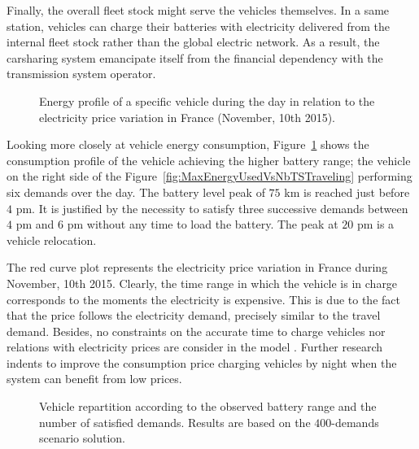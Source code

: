 \begin{bibunit}[ieeetr]
Finally, the overall fleet stock might serve the vehicles themselves.
In a same station, vehicles can charge their batteries with electricity delivered from the internal fleet stock rather than the global electric network.
As a result, the carsharing system emancipate itself from the financial dependency with the transmission system operator.


\begin{figure}[p]
\flushleft

\caption{Energy profile of a specific vehicle during the day in relation to the electricity price variation in France (November, 10th 2015).}
\label{fig:plotProfileV4}
\end{figure}

\bigskip
Looking more closely at vehicle energy consumption, Figure~\ref{fig:plotProfileV4} shows the consumption profile of the vehicle achieving the higher battery range; \ie the vehicle on the right side of the {Figure~\ref{fig:MaxEnergyUsedVsNbTSTraveling}} performing six demands over the day.
The battery level peak of $75$ km is reached just before $4$ pm.
It is justified by the necessity to satisfy three successive demands between $4$ pm and $6$ pm without any time to load the battery.
The peak at $20$ pm is a vehicle relocation.

The red curve plot represents the electricity price variation in France during November, 10th 2015.
Clearly, the time range in which the vehicle is in charge corresponds to the moments the electricity is expensive.
This is due to the fact that the price follows the electricity demand, precisely similar to the travel demand.
Besides, no constraints on the accurate time to charge vehicles nor relations with electricity prices are consider in the model {\ENERGY}.
Further research indents to improve the consumption price charging vehicles by night when the system can benefit from low prices.

\begin{figure}[p]
\flushleft

\caption{Vehicle repartition according to the observed battery range and the number of satisfied demands. Results are based on the $400$-demands scenario solution.}
\label{fig:plotD400MaxEnergyUsedVsNbSatisfiedDemands}
\end{figure}


\end{bibunit}
